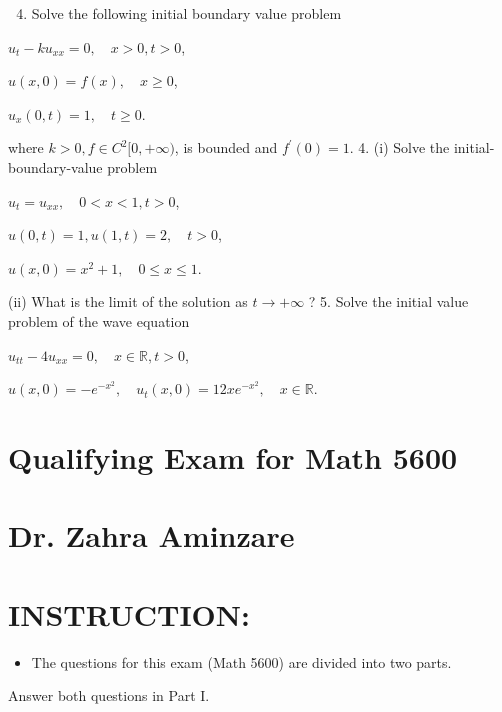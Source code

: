 \documentclass[10pt]{article}
\begin{document}
\begin{enumerate}
  \setcounter{enumi}{3}
  \item Solve the following initial boundary value problem
\end{enumerate}
$u_{t}-k u_{x x}=0, \quad x>0, t>0$,

$u(x, 0)=f(x), \quad x \geq 0$,

$u_{x}(0, t)=1, \quad t \geq 0$.

where $k>0, f \in C^{2}[0,+\infty)$, is bounded and $f^{\prime}(0)=1$. 4. (i) Solve the initial-boundary-value problem

$u_{t}=u_{x x}, \quad 0<x<1, t>0$,

$u(0, t)=1, u(1, t)=2, \quad t>0$,

$u(x, 0)=x^{2}+1, \quad 0 \leq x \leq 1 .$

(ii) What is the limit of the solution as $t \rightarrow+\infty$ ? 5. Solve the initial value problem of the wave equation

$u_{t t}-4 u_{x x}=0, \quad x \in \mathbb{R}, t>0$,

$u(x, 0)=-e^{-x^{2}}, \quad u_{t}(x, 0)=12 x e^{-x^{2}}, \quad x \in \mathbb{R} .$

\section*{Qualifying Exam for Math 5600 }


\section*{Dr. Zahra Aminzare }
\section{INSTRUCTION:}
\begin{itemize}
  \item The questions for this exam (Math 5600) are divided into two parts.
\end{itemize}
Answer both questions in Part I.
\end{document}
